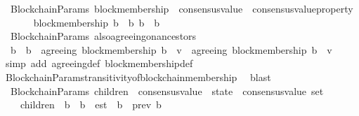 \begin{isabellebody}
\isanewline
\isanewline
\isanewline
{}\isamarkupfalse%
\ {\isacharparenleft}\ BlockchainParams{\isacharparenright}\ block{\isacharunderscore}membership\ {\isacharcolon}{\isacharcolon}\ {\isachardoublequoteopen}consensus{\isacharunderscore}value\ {\isasymRightarrow}\ consensus{\isacharunderscore}value{\isacharunderscore}property{\isachardoublequoteclose}\isanewline
\ \ \isanewline
\ \ \ \ {\isachardoublequoteopen}block{\isacharunderscore}membership\ b\ {\isacharequal}\ {\isacharparenleft}{\isasymlambda}b{\isacharprime}{\isachardot}\ b\ {\isasymdownharpoonright}\ b{\isacharprime}{\isacharparenright}{\isachardoublequoteclose}\isanewline
\isanewline
{}\isamarkupfalse%
\ {\isacharparenleft}\ BlockchainParams{\isacharparenright}\ also{\isacharunderscore}agreeing{\isacharunderscore}on{\isacharunderscore}ancestors\ {\isacharcolon}\isanewline
\ \ {\isachardoublequoteopen}b{\isacharprime}\ {\isasymdownharpoonright}\ b\ {\isasymLongrightarrow}\ agreeing\ {\isacharparenleft}block{\isacharunderscore}membership\ b{\isacharcomma}\ {\isasymsigma}{\isacharcomma}\ v{\isacharparenright}\ {\isasymLongrightarrow}\ agreeing\ {\isacharparenleft}block{\isacharunderscore}membership\ b{\isacharprime}{\isacharcomma}\ {\isasymsigma}{\isacharcomma}\ v{\isacharparenright}{\isachardoublequoteclose}\isanewline
%
\isadelimproof
\ \ %
\endisadelimproof
%
\isatagproof
{}\isamarkupfalse%
\ {\isacharparenleft}simp\ add{\isacharcolon}\ agreeing{\isacharunderscore}def\ block{\isacharunderscore}membership{\isacharunderscore}def{\isacharparenright}\isanewline
\ \ \isamarkupfalse%
\ BlockchainParams{\isachardot}transitivity{\isacharunderscore}of{\isacharunderscore}blockchain{\isacharunderscore}membership\ \isamarkupfalse%
\ blast%
\endisatagproof
{\isafoldproof}%
%
\isadelimproof
\isanewline
%
\endisadelimproof
\isanewline
\isanewline
\isanewline
{}\isamarkupfalse%
\ {\isacharparenleft}\ BlockchainParams{\isacharparenright}\ children\ {\isacharcolon}{\isacharcolon}\ {\isachardoublequoteopen}consensus{\isacharunderscore}value\ {\isacharasterisk}\ state\ {\isasymRightarrow}\ consensus{\isacharunderscore}value\ set{\isachardoublequoteclose}\isanewline
\ \ \isanewline
\ \ \ \ {\isachardoublequoteopen}children\ {\isacharequal}\ {\isacharparenleft}{\isasymlambda}{\isacharparenleft}b{\isacharcomma}\ {\isasymsigma}{\isacharparenright}{\isachardot}\ {\isacharbraceleft}b{\isacharprime}\ {\isasymin}\ est\ {\isacharbackquote}{\isasymsigma}{\isachardot}\ b\ {\isacharequal}\ prev\ b{\isacharprime}{\isacharbraceright}{\isacharparenright}{\isachardoublequoteclose}\isanewline

\end{isabellebody}
